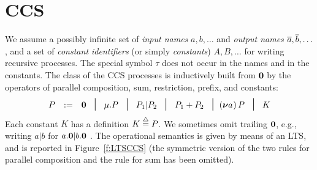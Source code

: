 
\section{CCS}
\label{ss:ccs}


We assume  a possibly infinite set of \emph{input names} $a, b,
\ldots$ and \emph{output names} $\overline{a}, \overline{b}, \ldots$,
 and a set of \emph{constant identifiers} (or simply \emph{constants})
 $A, B, \ldots$ for writing recursive processes. 
The special symbol $\tau$ does not occur in the names and in the 
constants. 
The class  of the CCS processes is inductively built from ${\boldsymbol 0}$ by the operators
of parallel composition,  sum,
 restriction, prefix, and constants:
\begin{equation*}
\begin{array}{ccl}
P  & := &  \nil \; \midd \;  \mu . P \; \midd \;  P_1 |  P_2 \; \midd  \;
P_1 + P_2 \; \midd %
  (\res a\!)\, P  \;  \midd \;   K   %
\end{array}
\end{equation*}
Each constant $K$ has  a definition 
 $K \stackrel{\mbox{\scriptsize $\triangle$}}{=} P$.
We sometimes omit trailing ${\boldsymbol 0}$, e.g., writing $a|b$ for $a.{\boldsymbol 0} |b .{\boldsymbol 0} $ .
The operational semantics is given by means of an LTS, and is
reported in Figure~\ref{f:LTSCCS} (the symmetric version  of the two rules for
parallel composition and the rule for sum  has been omitted).


